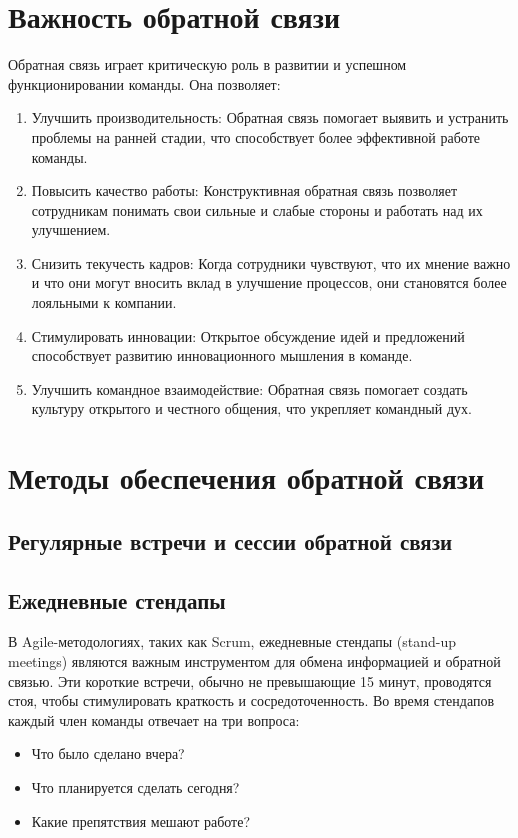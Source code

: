     \section{Важность обратной связи}
    Обратная связь играет критическую роль в развитии и успешном функционировании команды. Она позволяет:
    \begin{enumerate}
        \item Улучшить производительность: Обратная связь помогает выявить и устранить проблемы на ранней стадии, что способствует более эффективной работе команды.
        \item Повысить качество работы: Конструктивная обратная связь позволяет сотрудникам понимать свои сильные и слабые стороны и работать над их улучшением.
        \item Снизить текучесть кадров: Когда сотрудники чувствуют, что их мнение важно и что они могут вносить вклад в улучшение процессов, они становятся более лояльными к компании.
        \item Стимулировать инновации: Открытое обсуждение идей и предложений способствует развитию инновационного мышления в команде.
        \item Улучшить командное взаимодействие: Обратная связь помогает создать культуру открытого и честного общения, что укрепляет командный дух.
    \end{enumerate}

    \section{Методы обеспечения обратной связи}

    \subsection{Регулярные встречи и сессии обратной связи}
    
    \subsection*{Ежедневные стендапы}
    В Agile-методологиях, таких как Scrum, ежедневные стендапы (stand-up meetings) являются важным инструментом для обмена информацией и обратной связью. Эти короткие встречи, обычно не превышающие 15 минут, проводятся стоя, чтобы стимулировать краткость и сосредоточенность. Во время стендапов каждый член команды отвечает на три вопроса:
    
    \begin{itemize}
        \item Что было сделано вчера?
        \item Что планируется сделать сегодня?
        \item Какие препятствия мешают работе?
    \end{itemize}

